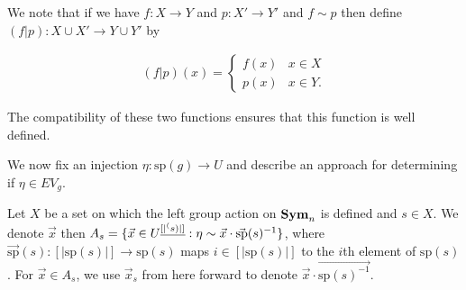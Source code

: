 \documentclass[12pt]{report}
\newcommand{\sym}{\text{\textbf{Sym}}}
\newcommand{\consp}{\text{sp}}
\newcommand{\type}{\text{type}}
\begin{document}
We note that if we have $f : X \rightarrow Y$ and $p: X' \rightarrow Y'$ and $f
\sim p$ then define $(f \vert p): X \cup X' \rightarrow Y \cup Y'$ by

\begin{align*}
  (f \vert p) (x) =
  \begin{cases}
    f (x) & x \in X \\
    p (x) & x \in Y.
  \end{cases}
\end{align*}

The compatibility of these two functions ensures that this function is well
defined.




We now fix an injection $\eta : \consp(g) \rightarrow U$ and describe an
approach for determining if $\eta \in EV_g$.

Let $X$ be a set on which the left group action on $\sym_n$ is defined and $s
\in X$. We denote $\vec{x}$ then $A_s = \{\vec{x} \in U^{\underline{[\vert
    \sp(s) \vert ]}} : \eta \sim \vec{x} \cdot \vec{\consp}(s)^{-1} \}$, where
$\vec{\consp}(s): [\vert \consp(s) \vert] \rightarrow \consp(s)$ maps $i \in
[\vert \consp(s) \vert]$ to the $i$th element of $\consp(s)$. For $\vec{x} \in
A_s$, we use $\vec{x}_s$ from here forward to denote $\vec{x} \cdot
\vec{\consp(s)^{-1}}$.

\end{document}
